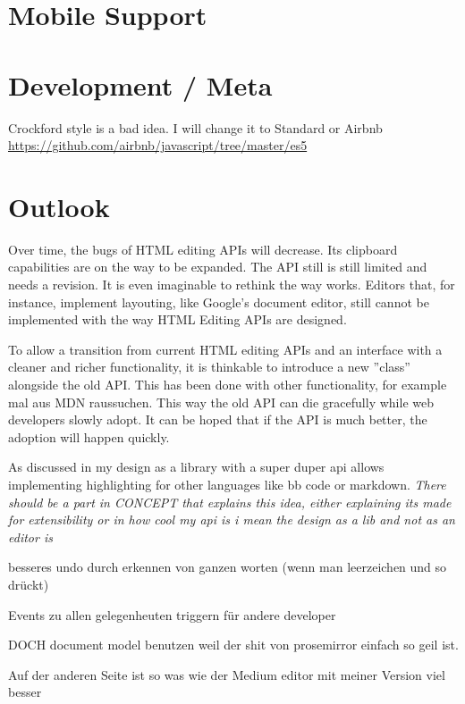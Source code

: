 

\section{Mobile Support}
\section{Development / Meta}
Crockford style is a bad idea. 
I will change it to Standard or Airbnb 
\url{https://github.com/airbnb/javascript/tree/master/es5}


\section{Outlook}

Over time, the bugs of HTML editing APIs will decrease. Its clipboard capabilities are on the way to be expanded. The API still is still limited and needs a revision. It is even imaginable to rethink the way  works. Editors that, for instance, implement layouting, like Google's document editor, still cannot be implemented with the way HTML Editing APIs are designed.

To allow a transition from current HTML editing APIs and an interface with a cleaner and richer functionality, it is thinkable to introduce a new ''class'' alongside the old API. This has been done with other functionality, for example mal aus MDN raussuchen. This way the old API can die gracefully while web developers slowly adopt. It can be hoped that if the API is much better, the adoption will happen quickly.


As discussed in  my design as a library with a super duper api allows implementing highlighting for other languages like bb code or markdown. \textit{There should be a part in CONCEPT that explains this idea, either explaining its made for extensibility or in how cool my api is i mean the design as a lib and not as an editor is}


besseres undo durch erkennen von ganzen worten (wenn man leerzeichen und so drückt)

Events zu allen gelegenheuten triggern für andere developer


DOCH document model benutzen weil der shit von prosemirror einfach so geil ist.

Auf der anderen Seite ist so was wie der Medium editor mit meiner Version viel besser